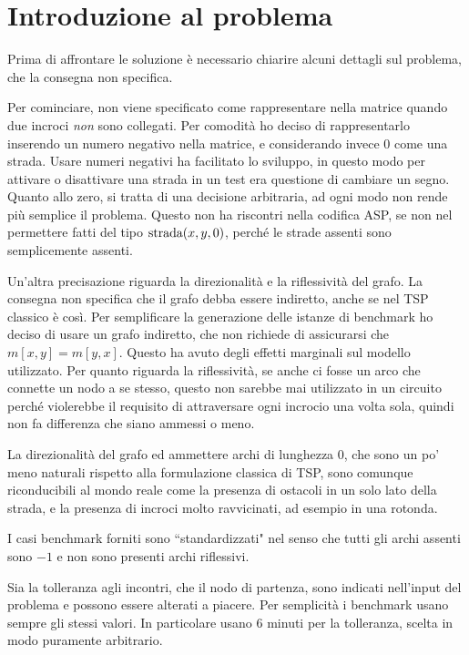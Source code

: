 \documentclass[11pt, a4paper]{article}
\begin{document}
\newpage

\tableofcontents

\newpage

\section{Introduzione al problema}

Prima di affrontare le soluzione è necessario chiarire alcuni dettagli sul problema, che la consegna non specifica.

Per cominciare, non viene specificato come rappresentare nella matrice quando due incroci \emph{non} sono collegati. Per comodità ho deciso di rappresentarlo inserendo un numero negativo nella matrice, e considerando invece $0$ come una strada.
Usare numeri negativi ha facilitato lo sviluppo, in questo modo per attivare o disattivare una strada in un test era questione di cambiare un segno. Quanto allo zero, si tratta di una decisione arbitraria, ad ogni modo non rende più semplice il problema.
Questo non ha riscontri nella codifica ASP, se non nel permettere fatti del tipo $\text{\lstinline{strada}}(x,y,0)$, perché le strade assenti sono semplicemente assenti.

Un'altra precisazione riguarda la direzionalità e la riflessività del grafo. La consegna non specifica che il grafo debba essere indiretto, anche se nel TSP classico è così.
Per semplificare la generazione delle istanze di benchmark ho deciso di usare un grafo indiretto, che non richiede di assicurarsi che $m[x,y]=m[y,x]$. Questo ha avuto degli effetti marginali sul modello utilizzato.
Per quanto riguarda la riflessività, se anche ci fosse un arco che connette un nodo a se stesso, questo non sarebbe mai utilizzato in un circuito perché violerebbe il requisito di attraversare ogni incrocio una volta sola, quindi non fa differenza che siano ammessi o meno.

La direzionalità del grafo ed ammettere archi di lunghezza $0$, che sono un po' meno naturali rispetto alla formulazione classica di TSP, sono comunque riconducibili al mondo reale come la presenza di ostacoli in un solo lato della strada, e la presenza di incroci molto ravvicinati, ad esempio in una rotonda.

I casi benchmark forniti sono ``standardizzati" nel senso che tutti gli archi assenti sono $-1$ e non sono presenti archi riflessivi.

Sia la tolleranza agli incontri, che il nodo di partenza, sono indicati nell'input del problema e possono essere alterati a piacere. Per semplicità i benchmark usano sempre gli stessi valori. In particolare usano $6$ minuti per la tolleranza, scelta in modo puramente arbitrario.
\end{document}
